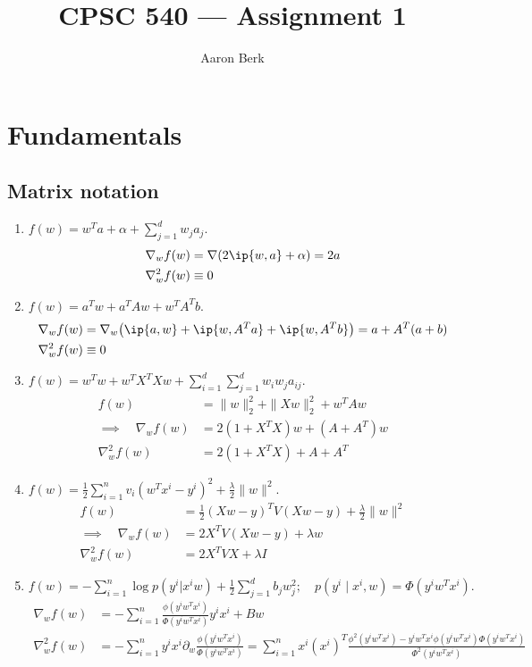 \documentclass{article}
\title{CPSC 540 --- Assignment 1}
\author{Aaron Berk}
\begin{document}
\maketitle


\section{Fundamentals}
\label{sec:fundamentals}


\subsection{Matrix notation}
\label{sec:matrix-notation}

\begin{enumerate}
\item $f(w) = w^Ta + \alpha + \sum_{j=1}^d w_ja_j.$
  \begin{align*}
    \nabla_w f(w) &= \nabla ( 2\ip{w, a} + \alpha) = 2a
    \\
    \nabla_w^2 f(w) &\equiv 0
  \end{align*}
\item $f(w) = a^Tw + a^TAw + w^TA^Tb.$
  \begin{align*}
    \nabla_w f(w) %
    &= \nabla_w \big( \ip{a, w} + \ip{w, A^Ta} + \ip{w, A^T b}\big) %
    = a + A^T(a + b)
    \\
    \nabla_w^2 f(w) %
    &\equiv 0
  \end{align*}
\item $f(w) = w^Tw + w^TX^TXw + \sum_{i=1}^d\sum_{j=1}^d w_iw_ja_{ij}.$
  \begin{align*}
    f(w) &= \|w\|_2^2 + \|Xw\|_2^2 + w^T A w
    \\
    \implies \quad %
    \nabla_w f(w) &= 2(1+ X^TX)w + (A + A^T)w
    \\
    \nabla_w^2 f(w) &= 2(1+ X^TX) + A + A^T
  \end{align*}
\item $f(w) = \frac{1}{2}\sum_{i=1}^n v_i(w^Tx^i - y^i)^2 + \frac{\lambda}{2}\|w\|^2.$
  \begin{align*}
    f(w) &= \frac{1}{2} (Xw - y)^T V (Xw - y) + \frac{\lambda}{2} \|w\|^2
    \\
    \implies \quad \nabla_w f(w) %
         &= 2 X^T V (Xw-y) + \lambda w
    \\
    \nabla_w^2 f(w) %
         &= 2 X^T V X + \lambda I
  \end{align*}
\item $f(w) = - \sum_{i=1}^n \log p(y^i | x^i w) + \frac{1}{2}\sum_{j=1}^d
  b_jw_j^2;\quad p(y^i \mid x^i, w) = \Phi(y^i w^T x^i).$
  \begin{align*}
    \nabla_w f(w) %
    &= - \sum_{i=1}^n \frac{\phi(y^i w^T x^i)}{\Phi(y^i w^T x^i)}y^i x^i
      + Bw
    \\
    \nabla_w^2 f(w) %
    &= - \sum_{i=1}^n y^ix^i \partial_w \frac{\phi(y^i w^T x^i)}{\Phi(y^i w^T
      x^i)}
    = \sum_{i=1}^n x^i(x^i)^T \frac{\phi^2 (y^i w^T x^i ) - y^i w^T x^i \phi(y^i w^T x^i)
      \Phi(y^i w^T x^i )}{\Phi^2 (y^i w^T x^i)}
  \end{align*}


\end{enumerate}
\end{document}
